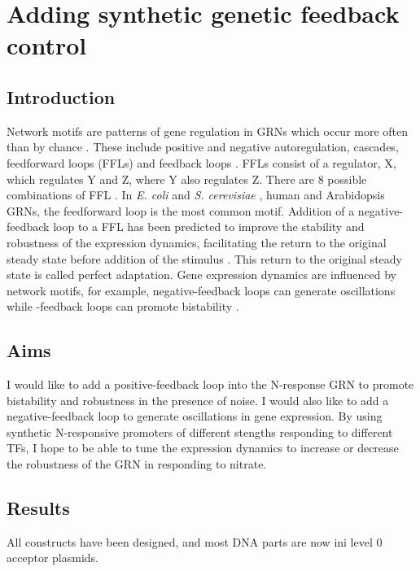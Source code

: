 \documentclass[../main.tex]{subfiles}
\begin{document}
\chapter{Adding synthetic genetic feedback control}\label{chapter6}
\section{Introduction}\label{chapter6:introduction}
Network motifs are patterns of gene regulation in GRNs which occur more often than by chance \autocite{miloNetworkMotifsSimple2002}.
These include positive and negative autoregulation, cascades, feedforward loops (FFLs) and feedback loops \autocite{shovalSnapShotNetworkMotifs2010}.
FFLs consist of a regulator, X, which regulates Y and Z, where Y also regulates Z.
There are 8 possible combinations of FFL \autocite{shovalSnapShotNetworkMotifs2010}.
In \textit{E. coli} \autocite{shen-orrNetworkMotifsTranscriptional2002} and \textit{S. cerevisiae} \autocite{leeTranscriptionalRegulatoryNetworks2002}, human \autocite{boyerCoreTranscriptionalRegulatory2005} and Arabidopsis \autocite{chenArchitectureGeneRegulatory2018} GRNs, the feedforward loop is the most common motif.
Addition of a negative-feedback loop to a FFL has been predicted to improve the stability and robustness of the expression dynamics, facilitating the return to the original steady state before addition of the stimulus \autocite{reevesEngineeringPrinciplesCombining2019}.
This return to the original steady state is called perfect adaptation.
Gene expression dynamics are influenced by network motifs, for example, negative\hyp{}feedback loops can generate oscillations while \hyp{}feedback loops can promote bistability \autocite{shovalSnapShotNetworkMotifs2010}.
\section{Aims}\label{chapter6:aims}
I would like to add a positive\hyp{}feedback loop into the N-response GRN to promote bistability and robustness in the presence of noise. I would also like to add a negative\hyp{}feedback loop to generate oscillations in gene expression.
By using synthetic N-responsive promoters of different stengths responding to different TFs, I hope to be able to tune the expression dynamics to increase or decrease the robustness of the GRN in responding to nitrate.
\section{Results}\label{chapter6:results}
All constructs have been designed, and most DNA parts are now ini level 0 acceptor plasmids.
\end{document}
